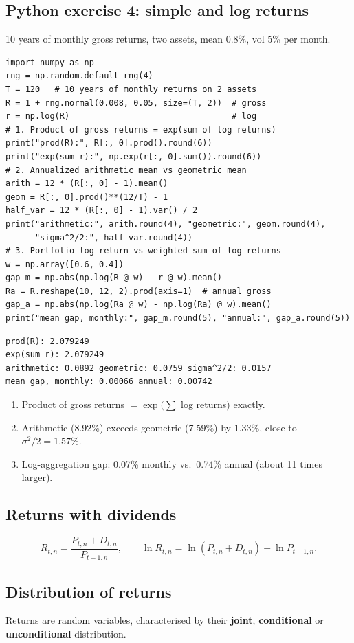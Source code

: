 \documentclass[11pt,a4paper]{report}
\begin{document}
\subsection*{Python exercise 4: simple and log returns}
10 years of monthly gross returns, two assets, mean 0.8\%, vol 5\% per month.
\begin{lstlisting}
import numpy as np
rng = np.random.default_rng(4)
T = 120   # 10 years of monthly returns on 2 assets
R = 1 + rng.normal(0.008, 0.05, size=(T, 2))  # gross
r = np.log(R)                                 # log
# 1. Product of gross returns = exp(sum of log returns)
print("prod(R):", R[:, 0].prod().round(6))
print("exp(sum r):", np.exp(r[:, 0].sum()).round(6))
# 2. Annualized arithmetic mean vs geometric mean
arith = 12 * (R[:, 0] - 1).mean()
geom = R[:, 0].prod()**(12/T) - 1
half_var = 12 * (R[:, 0] - 1).var() / 2
print("arithmetic:", arith.round(4), "geometric:", geom.round(4),
      "sigma^2/2:", half_var.round(4))
# 3. Portfolio log return vs weighted sum of log returns
w = np.array([0.6, 0.4])
gap_m = np.abs(np.log(R @ w) - r @ w).mean()
Ra = R.reshape(10, 12, 2).prod(axis=1)  # annual gross
gap_a = np.abs(np.log(Ra @ w) - np.log(Ra) @ w).mean()
print("mean gap, monthly:", gap_m.round(5), "annual:", gap_a.round(5))
\end{lstlisting}
\begin{lstlisting}[style=out]
prod(R): 2.079249
exp(sum r): 2.079249
arithmetic: 0.0892 geometric: 0.0759 sigma^2/2: 0.0157
mean gap, monthly: 0.00066 annual: 0.00742
\end{lstlisting}
\begin{enumerate}
  \item Product of gross returns $=\exp(\sum$ log returns$)$ exactly.
  \item Arithmetic (8.92\%) exceeds geometric (7.59\%) by 1.33\%, close to $\sigma^2/2=1.57\%$.
  \item Log-aggregation gap: 0.07\% monthly vs.\ 0.74\% annual (about 11 times larger).
\end{enumerate}

\subsection{Returns with dividends}
\[
R_{t,n}=\frac{P_{t,n}+D_{t,n}}{P_{t-1,n}},\qquad
\ln R_{t,n}=\ln(P_{t,n}+D_{t,n})-\ln P_{t-1,n}.
\]

\subsection{Distribution of returns}
Returns are random variables, characterised by their \textbf{joint},
\textbf{conditional} or \textbf{unconditional} distribution.
\end{document}
